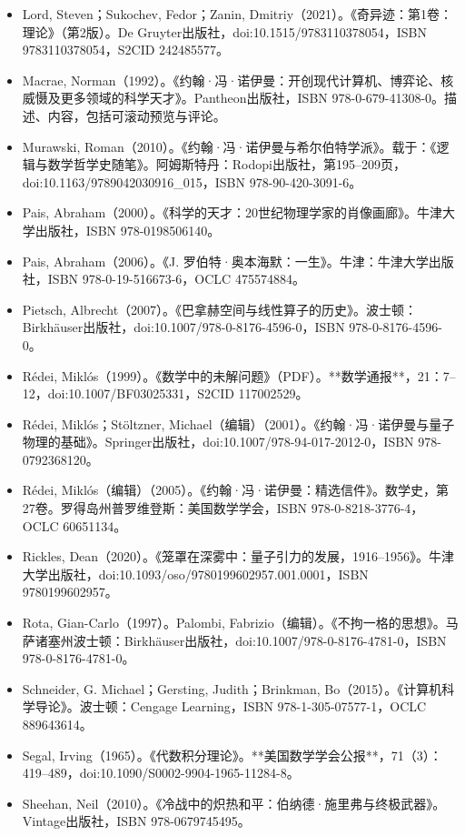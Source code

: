 \begin{itemize}
\item Lord, Steven；Sukochev, Fedor；Zanin, Dmitriy（2021）。《奇异迹：第1卷：理论》（第2版）。De Gruyter出版社，doi:10.1515/9783110378054，ISBN 9783110378054，S2CID 242485577。  
\item Macrae, Norman（1992）。《约翰·冯·诺伊曼：开创现代计算机、博弈论、核威慑及更多领域的科学天才》。Pantheon出版社，ISBN 978-0-679-41308-0。描述、内容，包括可滚动预览与评论。  
\item Murawski, Roman（2010）。《约翰·冯·诺伊曼与希尔伯特学派》。载于：《逻辑与数学哲学史随笔》。阿姆斯特丹：Rodopi出版社，第195–209页，doi:10.1163/9789042030916_015，ISBN 978-90-420-3091-6。
\item Pais, Abraham（2000）。《科学的天才：20世纪物理学家的肖像画廊》。牛津大学出版社，ISBN 978-0198506140。  
\item Pais, Abraham（2006）。《J. 罗伯特·奥本海默：一生》。牛津：牛津大学出版社，ISBN 978-0-19-516673-6，OCLC 475574884。  
\item Pietsch, Albrecht（2007）。《巴拿赫空间与线性算子的历史》。波士顿：Birkhäuser出版社，doi:10.1007/978-0-8176-4596-0，ISBN 978-0-8176-4596-0。  
\item Rédei, Miklós（1999）。《数学中的未解问题》（PDF）。**数学通报**，21：7–12，doi:10.1007/BF03025331，S2CID 117002529。  
\item Rédei, Miklós；Stöltzner, Michael（编辑）（2001）。《约翰·冯·诺伊曼与量子物理的基础》。Springer出版社，doi:10.1007/978-94-017-2012-0，ISBN 978-0792368120。  
\item Rédei, Miklós（编辑）（2005）。《约翰·冯·诺伊曼：精选信件》。数学史，第27卷。罗得岛州普罗维登斯：美国数学学会，ISBN 978-0-8218-3776-4，OCLC 60651134。
\item Rickles, Dean（2020）。《笼罩在深雾中：量子引力的发展，1916–1956》。牛津大学出版社，doi:10.1093/oso/9780199602957.001.0001，ISBN 9780199602957。  
\item Rota, Gian-Carlo（1997）。Palombi, Fabrizio（编辑）。《不拘一格的思想》。马萨诸塞州波士顿：Birkhäuser出版社，doi:10.1007/978-0-8176-4781-0，ISBN 978-0-8176-4781-0。  
\item Schneider, G. Michael；Gersting, Judith；Brinkman, Bo（2015）。《计算机科学导论》。波士顿：Cengage Learning，ISBN 978-1-305-07577-1，OCLC 889643614。  
\item Segal, Irving（1965）。《代数积分理论》。**美国数学学会公报**，71（3）：419–489，doi:10.1090/S0002-9904-1965-11284-8。  
\item Sheehan, Neil（2010）。《冷战中的炽热和平：伯纳德·施里弗与终极武器》。Vintage出版社，ISBN 978-0679745495。  

\end{itemize}
